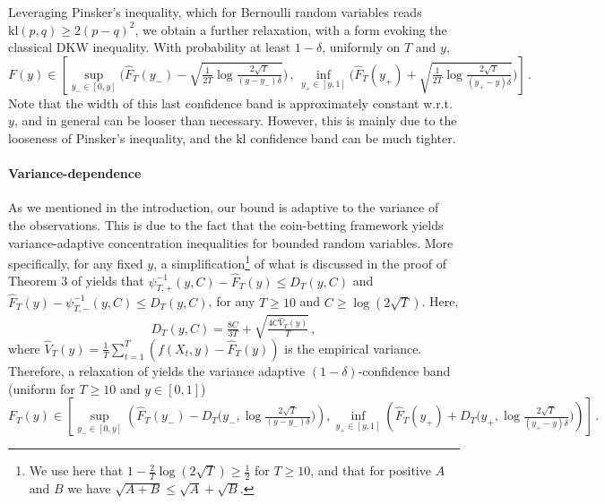 \documentclass[3p, authoryear, 10pt]{elsarticle}%
\newcommand{\kl}{\mathrm{kl}}
\begin{document}
Leveraging Pinsker's inequality, which for Bernoulli random variables reads $\kl(p,q) \geq 2(p-q)^2$, we obtain a further relaxation, with a form evoking the classical DKW inequality. With probability at least $1 - \delta$, uniformly on $T$ and $y$, 
\begin{equation}\label{eq:pinsker}F(y)\in\left[\sup_{y_-\in[0,y]}\Big(\hat F_T(y_-) - \sqrt{ \tfrac{1}{2T}\log\tfrac{2\sqrt T}{(y-y_-)\delta}}\Big)\,,\, \inf_{y_+\in[y,1]}\Big(\hat F_T(y_+) + \sqrt{ \tfrac{1}{2T}\log\tfrac{2\sqrt T}{(y_+-y)\delta}}\Big)\right]\,.\end{equation}
Note that the width of this last confidence band is approximately constant w.r.t.\ $y$, and in general can be looser than necessary. However, this is mainly due to the looseness of Pinsker's inequality, and the $\kl$ confidence band can be much tighter.

\paragraph{Variance-dependence} 
As we mentioned in the introduction, our bound is adaptive to the variance of the observations. This is due to the fact that the coin-betting framework yields variance-adaptive concentration inequalities for bounded random variables. More specifically, for any fixed $y$, a simplification\footnote{We use here that $1-\frac{2}{T}\log(2\sqrt T)\geq\frac12$ for $T\geq 10$, and that for positive $A$ and $B$ we have $\sqrt{A+B}\leq\sqrt A+\sqrt B$.} of what is discussed in the proof of Theorem 3 of \cite{orabona2023tight} yields that $\psi_{T, +}^{-1}(y,C) - \hat F_T(y)\leq D_T(y,C)$ and $\hat F_T(y)-\psi_{T, -}^{-1}(y,C) \leq D_T(y,C)$, for any $T\geq 10$ and $C\geq \log(2\sqrt T)$. Here,
$$D_T(y, C) = \tfrac{8C}{3T} + \sqrt{\tfrac{4C\hat V_T(y)}{T}}\,,$$
where $\hat V_T(y) = \frac{1}{T}\sum_{t=1}^T (f(X_t, y)-\hat F_T(y))$ is the empirical variance. Therefore, a relaxation of  yields the variance adaptive $(1-\delta)$-confidence band (uniform for $T\geq 10$ and $y\in[0,1]$)
$$F_T(y) \in \left[\sup_{y_-\in[0,y]}\left(\hat F_T(y_-) - D_T\big(y_-, \log\tfrac{2\sqrt T}{(y-y_-)\delta}\big)\right),\inf_{y_+\in[y,1]}\left(\hat F_T(y_+) + D_T\big(y_+, \log\tfrac{2\sqrt T}{(y_+-y)\delta}\big)\right)\right]\,.$$
\end{document}
